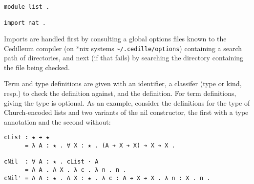 \documentclass{article}
\begin{document}
\begin{verbatim}
module list .

import nat .
\end{verbatim}

\noindent Imports are handled first by consulting a global options files
known to the Cedilleum compiler (on *nix systems \verb|~/.cedille/options|)
containing a search path of directories, and next (if that fails) by searching
the directory containing the file being checked.

Term and type definitions are given with an identifier, a classifer (type or
kind, resp.) to check the definition against, and the definition. For term
definitions, giving the type is optional. As an example, consider the
definitions for the type of Church-encoded lists and two variants of the nil
constructor, the first with a type annotation and the second without:

\begin{verbatim}
cList : ★ ➔ ★
      = λ A : ★ . ∀ X : ★ . (A ➔ X ➔ X) ➔ X ➔ X .

cNil  : ∀ A : ★ . cList · A
      = Λ A . Λ X . λ c . λ n . n .
cNil' = Λ A : ★ . Λ X : ★ . λ c : A ➔ X ➔ X . λ n : X . n .
\end{verbatim}
\end{document}
